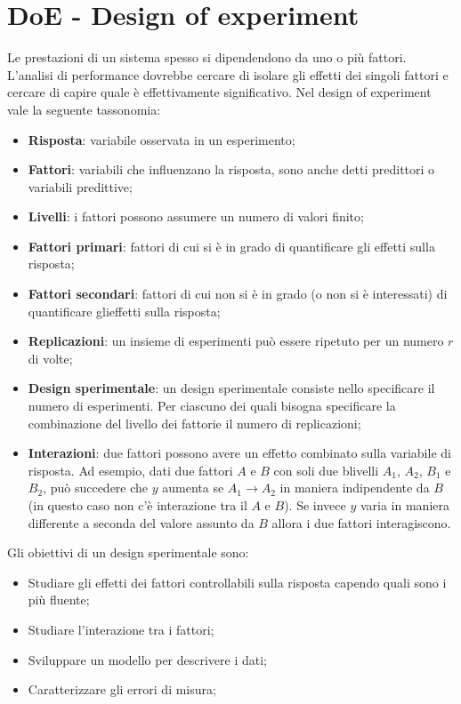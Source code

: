 \documentclass{article}
\begin{document}
\section{DoE - Design of experiment}
Le prestazioni di un sistema spesso si dipendendono da uno o più fattori. L'analisi di 
performance dovrebbe cercare di isolare gli effetti dei singoli fattori e cercare di capire
quale è effettivamente significativo. Nel design of experiment vale la seguente tassonomia:
\begin{itemize}
  \item \textbf{Risposta}: variabile osservata in un esperimento;
  \item \textbf{Fattori}: variabili che influenzano la risposta, sono anche detti predittori
    o variabili predittive;
  \item \textbf{Livelli}: i fattori possono assumere un numero di valori finito;
  \item \textbf{Fattori primari}: fattori di cui si è in grado di quantificare gli effetti 
    sulla risposta;
  \item \textbf{Fattori secondari}: fattori di cui non si è in grado (o non si è interessati) 
    di quantificare glieffetti sulla risposta;
  \item \textbf{Replicazioni}: un insieme di esperimenti può essere ripetuto per un numero 
    $r$ di volte;
  \item \textbf{Design sperimentale}: un design sperimentale consiste nello specificare il 
    numero di esperimenti. Per ciascuno dei quali bisogna specificare la combinazione del 
    livello dei fattorie il numero di replicazioni;
  \item \textbf{Interazioni}: due fattori possono avere un effetto combinato sulla variabile
    di risposta. Ad esempio, dati due fattori $A$ e $B$ con soli due blivelli $A_1$, $A_2$, 
    $B_1$ e $B_2$, può succedere che $y$ aumenta se $A_1 \to A_2$ in maniera indipendente 
    da $B$ (in questo caso non c'è interazione tra il $A$ e $B$). Se invece $y$ varia in 
    maniera differente a seconda del valore assunto da $B$ allora i due fattori interagiscono.
\end{itemize}

Gli obiettivi di un design sperimentale sono:
\begin{itemize}
  \item Studiare gli effetti dei fattori controllabili sulla risposta capendo quali sono i 
    più fluente;
  \item Studiare l'interazione tra i fattori;
  \item Sviluppare un modello per descrivere i dati;
  \item Caratterizzare gli errori di misura;
\end{itemize}
\end{document}
